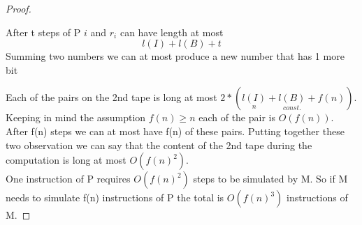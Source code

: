 \begin{theorem}
\begin{proof}
        \begin{lemma}
            After t steps of P $i$ and $r_i$ can have length at most 
            \[ 
                l(I)+l(B)+t 
            \]Summing two numbers we can at most produce a new number that has 1 more bit
        \end{lemma}
        Each of the pairs on the 2nd tape is long at most $2*(\underset{n}{l(I)}+\underset{const.}{l(B)}+f(n))$. Keeping in mind the assumption $f(n)\geq n$ each of the pair is $O(f(n))$. After f(n) steps we can at most have f(n) of these pairs. Putting together these two observation we can say that the content of the 2nd tape during the computation is long at most $O(f(n)^2)$.\\ One instruction of P requires $O(f(n)^2)$ steps to be simulated by M. So if M needs to simulate f(n) instructions of P the total is $O(f(n)^3)$ instructions of M.
    \end{proof}
\end{theorem}

